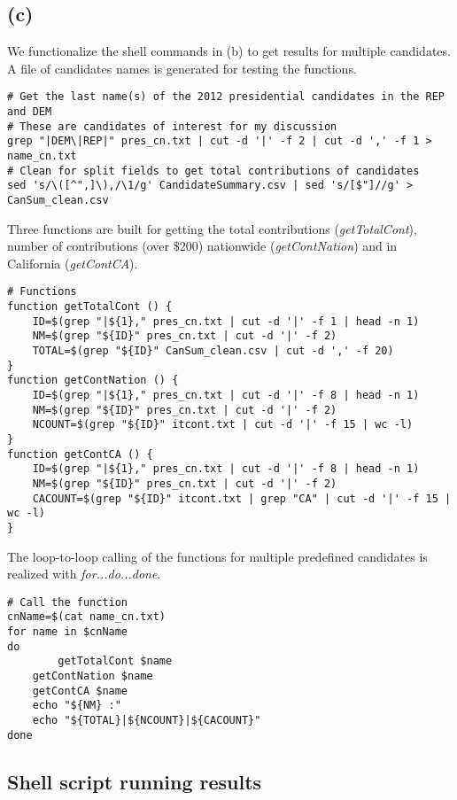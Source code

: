 \documentclass{article}
\begin{document}
\subsection*{(c)}

We functionalize the shell commands in (b) to get results for multiple candidates. A file of candidates names is generated for testing the functions.

\begin{lstlisting}
# Get the last name(s) of the 2012 presidential candidates in the REP and DEM
# These are candidates of interest for my discussion
grep "|DEM\|REP|" pres_cn.txt | cut -d '|' -f 2 | cut -d ',' -f 1 > name_cn.txt
# Clean for split fields to get total contributions of candidates
sed 's/\([^",]\),/\1/g' CandidateSummary.csv | sed 's/[$"]//g' > CanSum_clean.csv
\end{lstlisting}

Three functions are built for getting the total contributions (\textit{getTotalCont}), number of contributions 
(over \$200) nationwide (\textit{getContNation}) and in California (\textit{getContCA}).

\begin{lstlisting}
# Functions
function getTotalCont () {
    ID=$(grep "|${1}," pres_cn.txt | cut -d '|' -f 1 | head -n 1)
    NM=$(grep "${ID}" pres_cn.txt | cut -d '|' -f 2)
    TOTAL=$(grep "${ID}" CanSum_clean.csv | cut -d ',' -f 20)
}
function getContNation () {
    ID=$(grep "|${1}," pres_cn.txt | cut -d '|' -f 8 | head -n 1)
    NM=$(grep "${ID}" pres_cn.txt | cut -d '|' -f 2)
    NCOUNT=$(grep "${ID}" itcont.txt | cut -d '|' -f 15 | wc -l)
}
function getContCA () {
    ID=$(grep "|${1}," pres_cn.txt | cut -d '|' -f 8 | head -n 1)
    NM=$(grep "${ID}" pres_cn.txt | cut -d '|' -f 2)
    CACOUNT=$(grep "${ID}" itcont.txt | grep "CA" | cut -d '|' -f 15 | wc -l)
}
\end{lstlisting}

The loop-to-loop calling of the functions for multiple predefined candidates is realized with \textit{for...do...done}.

\begin{lstlisting}
# Call the function
cnName=$(cat name_cn.txt)
for name in $cnName
do
		getTotalCont $name
    getContNation $name
    getContCA $name
    echo "${NM} :"
    echo "${TOTAL}|${NCOUNT}|${CACOUNT}"
done
\end{lstlisting}

\subsection*{Shell script running results}
\end{document}
